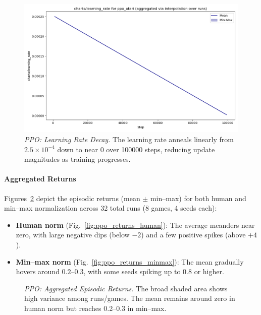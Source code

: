 \begin{figure} 
	\centering
	\includegraphics[width=.5\textwidth]{figures/ppo/charts_learning_rate_ppo_atari.png}
	\caption{\emph{PPO: Learning Rate Decay.}
		The learning rate anneals linearly from $2.5\times10^{-4}$ down to near $0$ 
		over \num{100000} steps, reducing update magnitudes as training progresses.}
	\label{fig:ppo_lr}
\end{figure}

\paragraph{Aggregated Returns}
Figures~\ref{fig:ppo_returns_agg} depict the episodic returns (mean $\pm$ min--max) 
for both human and min--max normalization across 32 total runs (8 games, 4 seeds each):
\begin{itemize}
	\item \textbf{Human norm} 
	(Fig.~\ref{fig:ppo_returns_human}): The average meanders near zero, with large 
	negative dips (below $-2$) and a few positive spikes (above $+4$).
	\item \textbf{Min--max norm}
	(Fig.~\ref{fig:ppo_returns_minmax}): The mean gradually hovers around $0.2$--$0.3$, 
	with some seeds spiking up to $0.8$ or higher.
\end{itemize}

\begin{figure}
	\centering
	\quad
	\caption{\emph{PPO: Aggregated Episodic Returns.} 
		The broad shaded area shows high variance among runs/games. 
		The mean remains around zero in human norm but reaches 0.2--0.3 in min--max.}
	\label{fig:ppo_returns_agg}
\end{figure}


